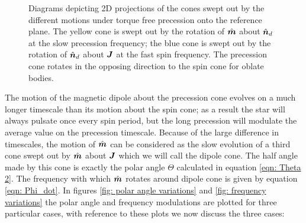 \documentclass[../full_thesis/full_thesis.tex]{subfiles}
\begin{document}
\begin{figure}[ht]
\centering
\caption{Diagrams depicting 2D projections of the cones swept out by the
    different motions under torque free precession onto the reference plane.
    The yellow cone is swept out by the rotation of $\hat{\boldsymbol{m}}$ about $\hat{\boldsymbol{n}}_{d}$ at the
    slow precession frequency; the blue cone is swept out by the rotation of
    $\hat{\boldsymbol{n}}_{d}$ about $\boldsymbol{J}$ at the fast spin frequency. The
precession cone rotates in the opposing direction to the spin cone for oblate
bodies.}
\label{fig: cones}
\end{figure}

The motion of the magnetic dipole about the precession cone evolves on a much
longer timescale than its motion about the spin cone; as a result the star will
always pulsate once every spin period, but the long precession will modulate
the average value on the precession timescale. Because of the large difference
in timescales, the motion of $\hat{\boldsymbol{m}}$ can be considered as the slow evolution of a
third cone swept out by $\hat{\boldsymbol{m}}$ about $\boldsymbol{J}$ which we will call the dipole cone. The
half angle made by this cone is exactly the polar angle $\Theta$ calculated in
equation \eqref{eqn: Theta 2}. The frequency with which $\hat{\boldsymbol{m}}$ rotates around
dipole cone is given by equation \eqref{eqn: Phi_dot}. In figures \ref{fig:
polar angle variations} and \ref{fig: frequency variations} the polar angle and
frequency modulations are plotted for three particular cases, with reference to
these plots we now discuss the three cases:
\end{document}
